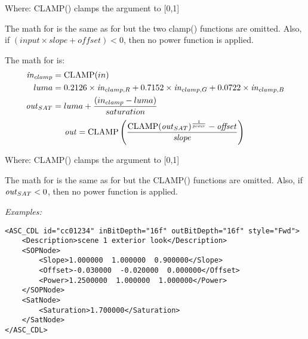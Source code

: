 \tabto{0.5in}Where:
\tabto{0.75in} CLAMP() clamps the argument to [0,1]

The math for  is the same as for  but the two clamp() functions are omitted. Also, if $(input \times slope + offset) < 0$, then no power function is applied.

The math for  is:
\begin{equation}
	\begin{aligned}
		\text{\emph{in}}_{clamp} &= \mathrm{CLAMP}(in) \\
		luma &= 0.2126 \times \text{\emph{in}}_{clamp,R} + 0.7152 \times \text{\emph{in}}_{clamp,G} + 0.0722 \times \text{\emph{in}}_{clamp,B} \\
		\text{\emph{out}}_{SAT} &= luma + \frac{(in_{clamp} - luma)}{saturation}
	\end{aligned}
\end{equation}
\begin{equation}  \label{eq:cdl-rev}
	\text{\emph{out}} = \mathrm{CLAMP}\left(\frac{\mathrm{CLAMP}(\text{\emph{out}}_{SAT})^{\frac{1}{\text{\emph{power}}}} - \text{\emph{offset}}}{\text{\emph{slope}}}\right) \\
\end{equation}

\tabto{0.5in}Where:
\tabto{0.75in} CLAMP() clamps the argument to [0,1]

The math for  is the same as for  but the CLAMP() functions are omitted. Also, if $\text{\emph{out}}_{SAT} < 0$, then no power function is applied.

\emph{Examples:}
\begin{lstlisting}[caption=Example of an \xml{ASC\_CDL} node,label=ex:asccdl]
<ASC_CDL id="cc01234" inBitDepth="16f" outBitDepth="16f" style="Fwd">
	<Description>scene 1 exterior look</Description>
	<SOPNode>
		<Slope>1.000000  1.000000  0.900000</Slope>
		<Offset>-0.030000  -0.020000  0.000000</Offset>
		<Power>1.2500000  1.000000  1.000000</Power>
	</SOPNode>
	<SatNode>
		<Saturation>1.700000</Saturation>
	</SatNode>
</ASC_CDL>
\end{lstlisting}
